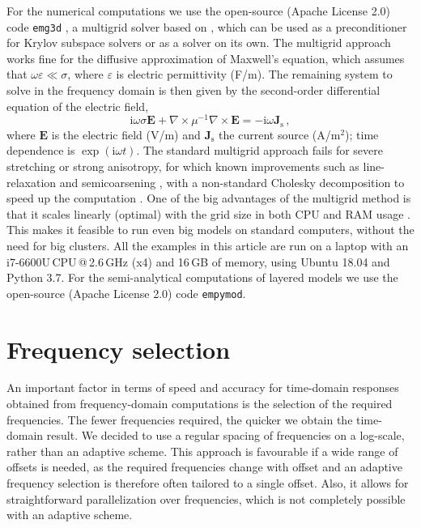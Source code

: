\documentclass[
    manuscript,
    revised,
  ]{geophysics}
\newcommand{\emg}[2]{\texttt{emg#1#2}\xspace}
\newcommand{\empymod}{\texttt{empymod}\xspace}
\begin{document}
For the numerical computations we use the open-source (Apache License 2.0) code
\emg3d \citep{JOSS.19.Werthmuller}, a multigrid solver based on
\cite{GP.06.Mulder}, which can be used as a preconditioner for Krylov subspace
solvers or as a solver on its own. The multigrid approach works fine for the
diffusive approximation of Maxwell's equation, which assumes that
$\omega\varepsilon \ll \sigma$, where $\varepsilon$ is electric permittivity
(F/m). The remaining system to solve in the frequency domain is then given by
the second-order differential equation of the electric field,
%
\begin{equation}
    \mathrm{i}\omega\sigma \mathbf{E} +
    \nabla \times \mu^{-1} \nabla \times \mathbf{E}
    = -\mathrm{i}\omega\mathbf{J}_\mathrm{s} \, ,
  \label{eq:maxwell}
\end{equation}
%
where $\mathbf{E}$ is the electric field (V/m) and $\mathbf{J}_\mathrm{s}$ the
current source (A/m$^2$); time dependence is $\exp(\mathrm{i}\omega t)$. The
standard multigrid approach fails for severe stretching or strong anisotropy,
for which \old{\emg3d has implemented }known improvements such as
line-relaxation and semicoarsening \citep{ECCFD.06.Jonsthovel} , with a non-standard Cholesky decomposition to speed up the
computation \citep{GEO.08.Mulder}. One of the big advantages of the multigrid
method is that it scales linearly (optimal) with the grid size in both CPU and
RAM usage \citep{B.Springer.20.Mulder}. This makes it feasible to run even big
models on standard computers, without the need for big clusters. All the
examples in this article are run on a laptop with an i7-6600U\,CPU\,@\,2.6\,GHz
(x4) and 16\,GB of memory, using Ubuntu 18.04 and Python 3.7. For the
semi-analytical computations of layered models we use the open-source (Apache
License 2.0) code \empymod \citep{GEO.17.Werthmuller}.

\section{Frequency selection}

An important factor in terms of speed and accuracy for time-domain responses
obtained from frequency-domain computations is the selection of the required
frequencies. The fewer frequencies required, the quicker we obtain the
time-domain result. We decided to use a regular spacing of frequencies on a
log-scale, rather than an adaptive scheme. This approach is favourable if a
wide range of offsets is needed, as the required frequencies change with offset
and an adaptive frequency selection is therefore often tailored to a single
offset. Also, it allows for straightforward parallelization over frequencies,
which is not completely possible with an adaptive scheme.
\end{document}

